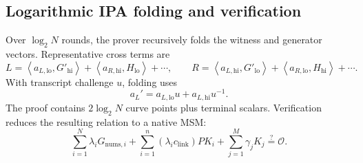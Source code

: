 \documentclass[10pt,a4paper]{article}
\newcommand{\ip}[2]{\left\langle #1,#2\right\rangle}
\newcommand{\Id}{\mathcal{O}}
\begin{document}

\subsection{Logarithmic IPA folding and verification}

Over $\log_2N$ rounds, the prover recursively folds the witness and generator
vectors. Representative cross terms are
\[
L=\ip{a_{L,\mathrm{lo}}}{G'_{\mathrm{hi}}}+
\ip{a_{R,\mathrm{hi}}}{H_{\mathrm{lo}}}+\cdots,\qquad
R=\ip{a_{L,\mathrm{hi}}}{G'_{\mathrm{lo}}}+
\ip{a_{R,\mathrm{lo}}}{H_{\mathrm{hi}}}+\cdots .
\]
With transcript challenge $u$, folding uses
\[
a_L'=a_{L,\mathrm{lo}}u+a_{L,\mathrm{hi}}u^{-1}.
\]
The proof contains $2\log_2N$ curve points plus terminal scalars. Verification
reduces the resulting relation to a native MSM:
\[
\sum_{i=1}^{N}\lambda_iG_{\mathrm{nums},i}
+\sum_{i=1}^{n}(\lambda_i c_{\mathrm{link}})PK_i
+\sum_{j=1}^{M}\gamma_jK_j
\stackrel{?}{=}\Id.
\]



\end{document}
